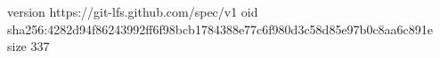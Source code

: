 version https://git-lfs.github.com/spec/v1
oid sha256:4282d94f86243992ff6f98bcb1784388e77c6f980d3c58d85e97b0c8aa6c891e
size 337
